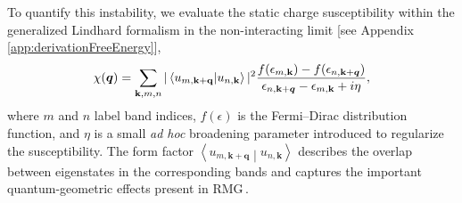 \documentclass[aps,prx,article,twocolumn,amsmath,amssymb,superscriptaddress,longbibliography]{revtex4-2}
\begin{document}
To quantify this instability, we evaluate the static charge susceptibility within the generalized Lindhard formalism in the non-interacting limit [see Appendix \ref{app:derivationFreeEnergy}],
\begin{align}\label{eq:susceptibility}
\chi({\vb*{q}}) =
\sum_{\mathbf{k},m,n}
|\left\langle u_{m,\mathbf k+\mathbf q} \middle| u_{n,\mathbf k}\right\rangle|^2
\frac{f(\epsilon_{m,\mathbf{k}})-f(\epsilon_{n,\mathbf{k}+{\vb*{q}}})}
{\epsilon_{n,\mathbf{k}+{\vb*{q}}}-\epsilon_{m,\mathbf{k}}+i\eta},
\end{align}
where $m$ and $n$ label band indices, $f(\epsilon)$ is the Fermi--Dirac distribution function, and $\eta$ is a small \textit{ad hoc} broadening parameter introduced to regularize the susceptibility. The form factor $\left\langle u_{m,\mathbf k+\mathbf q} \middle| u_{n,\mathbf k}\right\rangle$ describes the overlap between eigenstates in the corresponding bands and captures the important quantum-geometric effects present in RMG\,\cite{parramartinez2025band, jahin2026enhanced}. 
\end{document}
